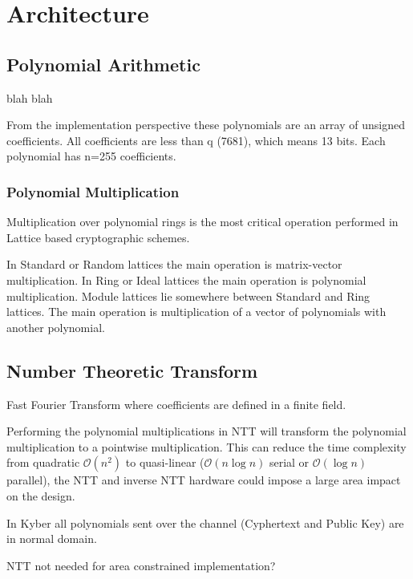 
\chapter{Architecture}




\section{Polynomial Arithmetic}

blah blah

From the implementation perspective these polynomials are an array 
of unsigned coefficients. 
All coefficients are less than q (7681), which means 13 bits.
Each polynomial has n=255 coefficients.



\subsection{Polynomial Multiplication}


Multiplication over polynomial rings is the most 
critical operation performed in Lattice based 
cryptographic schemes.

In Standard or Random lattices the main operation is matrix-vector 
multiplication. In Ring or Ideal lattices the main operation is
polynomial multiplication. 
Module lattices lie somewhere between Standard and Ring lattices.
The main operation is multiplication of a vector of polynomials with 
another polynomial.

\section{Number Theoretic Transform}
Fast Fourier Transform where coefficients are defined in a finite field.

Performing the polynomial multiplications in NTT will transform the 
polynomial multiplication to a pointwise multiplication. This 
can reduce the time complexity from quadratic $\mathcal{O}(n^2)$  to quasi-linear ($\mathcal{O}(n\log{}n)$ serial or $\mathcal{O}(\log{}n)$ parallel),
the NTT and inverse NTT hardware could impose a large area impact 
on the design.


In Kyber all polynomials sent over the channel (Cyphertext and Public Key) are in normal domain.

NTT not needed for area constrained implementation?

